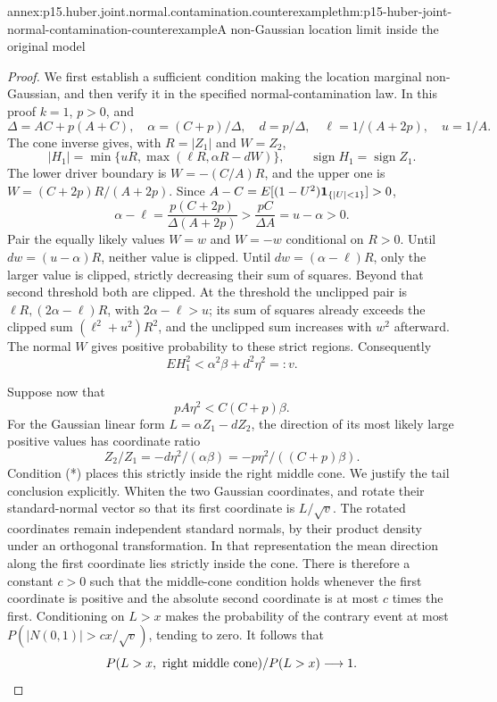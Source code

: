 \begin{annexitem}{annex:p15.huber.joint.normal.contamination.counterexample}{thm:p15-huber-joint-normal-contamination-counterexample}{A non-Gaussian location limit inside the original model}
\begin{proof}
We first establish a sufficient condition making the location
marginal non-Gaussian, and then verify it in the specified
normal-contamination law.
In this proof \(k=1\), \(p>0\), and
\[
 \Delta=AC+p(A+C),\quad
 \alpha=(C+p)/\Delta,\quad d=p/\Delta,\quad
 \ell=1/(A+2p),\quad u=1/A.
\]
The cone inverse gives, with \(R=|Z_1|\) and \(W=Z_2\),
\[
 |H_1|=\min\{uR,\max(\ell R,\alpha R-dW)\},
 \qquad \operatorname{sign}H_1=\operatorname{sign}Z_1.
\]
The lower driver boundary is \(W=-(C/A)R\), and the upper one
is \(W=(C+2p)R/(A+2p)\).
Since \(A-C=E[(1-U^2){\bf1}_{\{|U|<1\}}]>0\),
\[
 \alpha-\ell=\frac{p(C+2p)}{\Delta(A+2p)}
          >\frac{pC}{\Delta A}=u-\alpha>0 .
\]
Pair the equally likely values \(W=w\) and \(W=-w\) conditional
on \(R>0\). Until \(dw=(u-\alpha)R\), neither value is clipped.
Until \(dw=(\alpha-\ell)R\), only the larger value is clipped,
strictly decreasing their sum of squares.
Beyond that second threshold both are clipped. At the threshold
the unclipped pair is \(\ell R,(2\alpha-\ell)R\), with
\(2\alpha-\ell>u\); its sum of squares already exceeds the
clipped sum \((\ell^2+u^2)R^2\), and the unclipped sum increases
with \(w^2\) afterward.
The normal \(W\) gives positive probability to these strict regions.
Consequently
\[
              EH_1^2<\alpha^2\beta+d^2\eta^2=:v.
\]

Suppose now that
\[
                     pA\eta^2<C(C+p)\beta.                 \tag{*}
\]
For the Gaussian linear form \(L=\alpha Z_1-dZ_2\), the
direction of its most likely large positive values has coordinate
ratio
\[
       Z_2/Z_1=-d\eta^2/(\alpha\beta)
               =-p\eta^2/((C+p)\beta).
\]
Condition (*) places this strictly inside the right middle cone.
We justify the tail conclusion explicitly. Whiten the two
Gaussian coordinates, and rotate their standard-normal vector
so that its first coordinate is \(L/\sqrt v\).
The rotated coordinates remain independent standard normals,
by their product density under an orthogonal transformation.
In that representation the mean direction along the first
coordinate lies strictly inside the cone. There is therefore
a constant \(c>0\) such that the middle-cone condition holds
whenever the first coordinate is positive and the absolute
second coordinate is at most \(c\) times the first.
Conditioning on \(L>x\) makes the probability of the contrary
event at most \(P(|N(0,1)|>cx/\sqrt v)\), tending to zero.
It follows that
\[
 P(L>x,\ \hbox{right middle cone})/P(L>x)\longrightarrow1.
\]


\end{proof}
\end{annexitem}
